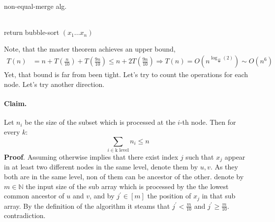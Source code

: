 \begin{algbox}{non-equal-merge alg.}
\begin{algorithm}[H]
\SetAlgoLined
{}
 \ \\ 
    { return bubble-sort \( (x_1 ... x_n)\) } 
 \ \\ 
 
\end{algorithm}
\end{algbox}
Note, that the master theorem achieves an upper bound, 
\begin{equation*}
    \begin{split}
        T\left(n\right) & = n +  T\left(\frac{n}{10}\right) + T\left(\frac{9n}{10}\right) \le n +  2 T\left(\frac{9n}{10}\right) \Rightarrow T\left(n\right) = O \left( n^{\log_{\frac{10}{9}}\left(2\right)} \right) \sim O \left( n^{ 6 } \right)  
    \end{split}
\end{equation*}
Yet, that bound is far from been tight. Let's try to count the operations for each node. Let's try another direction. 
\paragraph{Claim.} Let \(n_i\) be the size of the subset which is processed at the \(i\)-th node. Then for every \(k\):
\begin{equation*}
    \sum_{i \in \text{k level}}{n_i} \le n
\end{equation*}
 \textbf{Proof}. Assuming otherwise implies that there exist index \(j\) such that \(x_j\) appear in at least two different nodes in the same level, denote them by \(u,v\). As they both are in the same level, non of them can be ancestor of the other. denote by \(m \in \mathbb{N}\) the input size of the sub array which is processed by the the lowest common ancestor of \(u\) and \(v\), and by \(j^\prime \in [m]\) the position of \(x_j\) in that sub array. By the definition of the algorithm it steams that \(j^\prime < \frac{m}{10} \) and \(j^\prime \ge \frac{m}{10}\). contradiction.  


